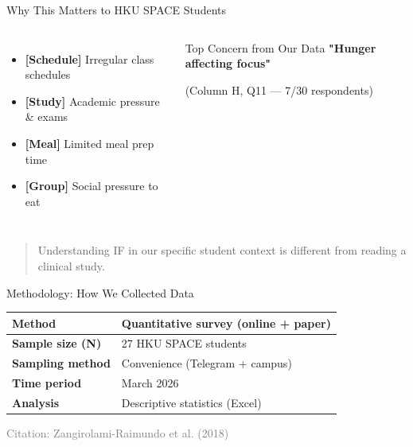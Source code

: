 \documentclass[aspectratio=169, 12pt]{beamer}
\begin{document}
\begin{frame}{Why This Matters to HKU SPACE Students}
  \begin{columns}[T]
    \begin{itemize}
      \item \textbf{[Schedule]} Irregular class schedules
      \item \textbf{[Study]} Academic pressure \& exams
      \item \textbf{[Meal]} Limited meal prep time
      \item \textbf{[Group]} Social pressure to eat
    \end{itemize}
    
    \begin{alertblock}{Top Concern from Our Data}
      \centering
      \Large \textbf{"Hunger affecting focus"}
      
      \vspace{0.3cm}
      \normalsize (Column H, Q11 — 7/30 respondents)
    \end{alertblock}
  \end{columns}
  
  \vspace{0.5cm}
  \begin{quote}
    Understanding IF in our specific student context is different from reading a clinical study.
  \end{quote}
\end{frame}

\begin{frame}{Methodology: How We Collected Data}
  \begin{table}
    \centering
    \begin{tabular}{|l|l|}
      \hline
      \rowcolor{hkuLight!30} \textbf{Method} & Quantitative survey (online + paper) \\
      \hline
      \textbf{Sample size (N)} & 27 HKU SPACE students \\
      \hline
      \textbf{Sampling method} & Convenience (Telegram + campus) \\
      \hline
      \textbf{Time period} & March 2026 \\
      \hline
      \textbf{Analysis} & Descriptive statistics (Excel) \\
      \hline
    \end{tabular}
  \end{table}
  
  \vspace{0.5cm}
  \begin{center}
    \tiny \textcolor{gray}{Citation: Zangirolami-Raimundo et al. (2018)}
  \end{center}
\end{frame}
\end{document}
